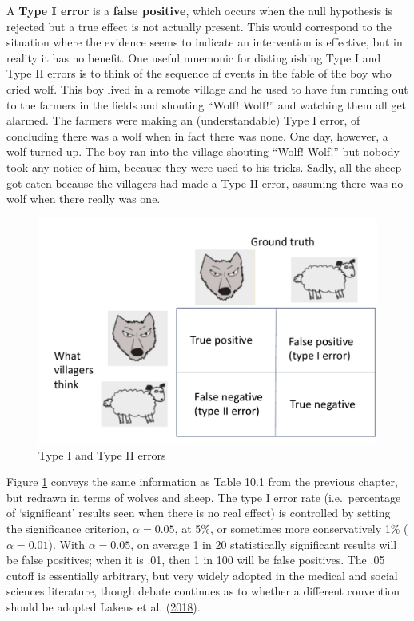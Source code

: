 \documentclass{krantz}
\begin{document}
A \textbf{Type I error} is a \textbf{false positive}, which occurs when the null hypothesis is rejected but a true effect is not actually present. This would correspond to the situation where the evidence seems to indicate an intervention is effective, but in reality it has no benefit. One useful mnemonic for distinguishing Type I and Type II errors is to think of the sequence of events in the fable of the boy who cried wolf. This boy lived in a remote village and he used to have fun running out to the farmers in the fields and shouting ``Wolf! Wolf!'' and watching them all get alarmed. The farmers were making an (understandable) Type I error, of concluding there was a wolf when in fact there was none. One day, however, a wolf turned up. The boy ran into the village shouting ``Wolf! Wolf!'' but nobody took any notice of him, because they were used to his tricks. Sadly, all the sheep got eaten because the villagers had made a Type II error, assuming there was no wolf when there really was one.\\


\begin{figure}
\includegraphics[width=0.8\linewidth]{images_bw/wolfsheeprevised} \caption{Type I and Type II errors}\label{fig:wolfsheepfig}
\end{figure}


Figure \ref{fig:wolfsheepfig} conveys the same information as Table 10.1 from the previous chapter, but redrawn in terms of wolves and sheep. The type I error rate (i.e.~percentage of `significant' results seen when there is no real effect) is controlled by setting the significance criterion, \(\alpha=0.05\), at 5\%, or sometimes more conservatively 1\% (\(\alpha=0.01\)). With \(\alpha=0.05\), on average 1 in 20 statistically significant results will be false positives; when it is .01, then 1 in 100 will be false positives. The .05 cutoff is essentially arbitrary, but very widely adopted in the medical and social sciences literature, though debate continues as to whether a different convention should be adopted Lakens et al. (\protect\hyperlink{ref-lakens2018}{2018}).
\end{document}
